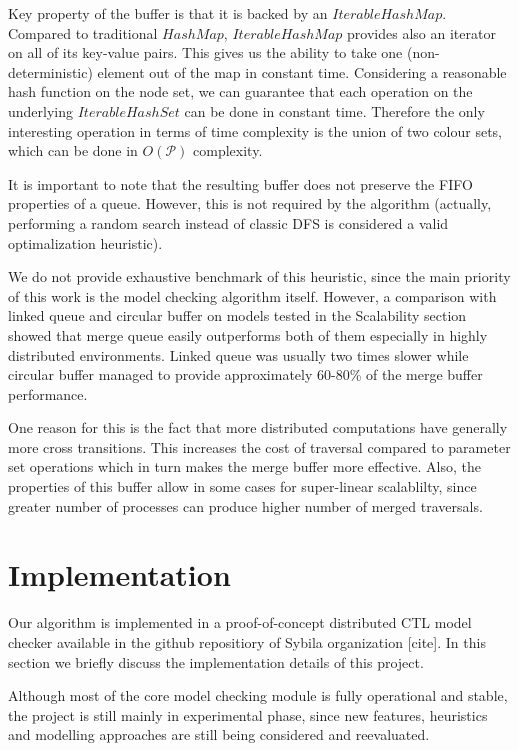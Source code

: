 \documentclass[12pt,oneside,draft]{fithesis2}
\newcommand{\params}{\mathcal{P}}
\begin{document}
			Key property of the buffer is that it is backed by an $IterableHashMap$. Compared to traditional $HashMap$, $IterableHashMap$ provides also an iterator on all of its key-value pairs. This gives us the ability to take one (non-deterministic) element out of the map in constant time. Considering a reasonable hash function on the node set, we can guarantee that each operation on the underlying $IterableHashSet$ can be done in constant time. Therefore the only interesting operation in terms of time complexity is the union of two colour sets, which can be done in $O(\params)$ complexity.
			
			It is important to note that the resulting buffer does not preserve the FIFO properties of a queue. However, this is not required by the algorithm (actually, performing a random search instead of classic DFS is considered a valid optimalization heuristic).
			
			We do not provide exhaustive benchmark of this heuristic, since the main priority of this work is the model checking algorithm itself. However, a comparison with linked queue and circular buffer on models tested in the Scalability section showed that merge queue easily outperforms both of them especially in highly distributed environments. Linked queue was usually two times slower while circular buffer managed to provide approximately 60-80\% of the merge buffer performance. 
			
			One reason for this is the fact that more distributed computations have generally more cross transitions. This increases the cost of traversal compared to parameter set operations which in turn makes the merge buffer more effective. Also, the properties of this buffer allow in some cases for super-linear scalablilty, since greater number of processes can produce higher number of merged traversals. 			
	
	\chapter{Implementation}

		Our algorithm is implemented in a proof-of-concept distributed CTL model checker available in the github repositiory of Sybila organization [cite]. In this section we briefly discuss the implementation details of this project. 
		
		Although most of the core model checking module is fully operational and stable, the project is still mainly in experimental phase, since new features, heuristics and modelling approaches are still being considered and reevaluated.
\end{document}
